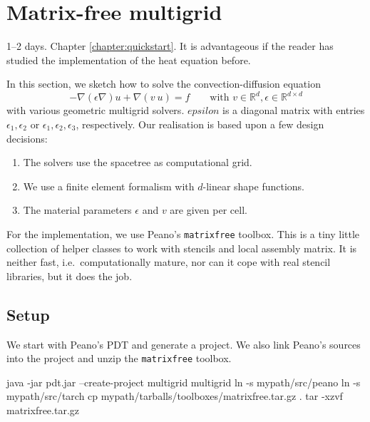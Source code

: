 \section{Matrix-free multigrid}
  \label{section:applications:matrix-free-multigrid}

\chapterDescription
  {
    1--2 days.
  }
  {
    Chapter \ref{chapter:quickstart}. It is advantageous if the reader has
    studied the implementation of the heat equation before.
  }

In this section, we sketch how to solve the convection-diffusion equation
\[
  - \nabla (\epsilon \nabla) u + \nabla (v\ u) = f \qquad \mbox{with } v \in
  \mathbb{R}^d, \epsilon \in \mathbb{R}^{d \times d}
\]
with various geometric multigrid solvers. $epsilon$ is a diagonal matrix with
entries $\epsilon _1, \epsilon _2$ or $\epsilon _1, \epsilon _2, \epsilon _3$,
respectively.
Our realisation is based upon a few design decisions:

\begin{enumerate}
  \item The solvers use the spacetree as computational grid.
  \item We use a finite element formalism with $d$-linear shape functions.
  \item The material parameters $\epsilon $ and $v$ are given per cell.
\end{enumerate}


\noindent
For the implementation, we use Peano's \texttt{matrixfree} toolbox. 
This is a tiny little collection of helper classes to work with stencils and
local assembly matrix. 
It is neither fast, i.e.~computationally mature, nor can it cope with real
stencil libraries, but it does the job.



\subsection{Setup}

We start with Peano's PDT and generate a project. We also link Peano's sources
into the project and unzip the \texttt{matrixfree} toolbox. 
\begin{code}
  java -jar pdt.jar --create-project multigrid multigrid
  ln -s mypath/src/peano 
  ln -s mypath/src/tarch
  cp mypath/tarballs/toolboxes/matrixfree.tar.gz .
  tar -xzvf matrixfree.tar.gz
\end{code}


